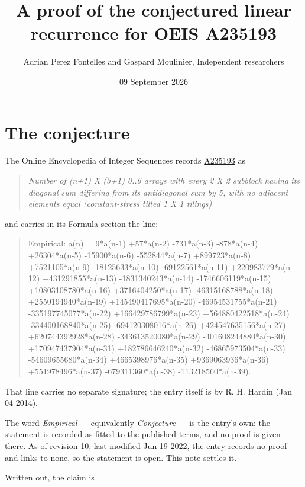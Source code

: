 \documentclass[11pt]{article}
\title{A proof of the conjectured linear recurrence for OEIS A235193}
\author{Adrian Perez Fontelles and Gaspard Moulinier, Independent researchers}
\date{09 September 2026}
\theoremstyle{definition}
\begin{document}
\maketitle
\section{The conjecture}

The Online Encyclopedia of Integer Sequences records \href{https://oeis.org/A235193}{A235193} as

\begin{quote}\itshape Number of (n+1) X (3+1) 0..6 arrays with every 2 X 2 subblock having its diagonal sum differing from its antidiagonal sum by 5, with no adjacent elements equal (constant-stress tilted 1 X 1 tilings)\end{quote}

and carries in its Formula section the line:

\begin{quote}\ttfamily Empirical: a(n) = 9*a(n-1) +57*a(n-2) -731*a(n-3) -878*a(n-4) +26304*a(n-5) -15900*a(n-6) -552844*a(n-7) +899723*a(n-8) +7521105*a(n-9) -18125633*a(n-10) -69122561*a(n-11) +220983779*a(n-12) +431291855*a(n-13) -1831340243*a(n-14) -1746606119*a(n-15) +10803108780*a(n-16) +3716404250*a(n-17) -46315168788*a(n-18) +2550194940*a(n-19) +145490417695*a(n-20) -46954531755*a(n-21) -335197745077*a(n-22) +166429786799*a(n-23) +564880422518*a(n-24) -334400168840*a(n-25) -694120308016*a(n-26) +424547635156*a(n-27) +620744392928*a(n-28) -343613520080*a(n-29) -401608244880*a(n-30) +170947437904*a(n-31) +182786646240*a(n-32) -46865973504*a(n-33) -54609655680*a(n-34) +4665398976*a(n-35) +9369063936*a(n-36) +551978496*a(n-37) -679311360*a(n-38) -113218560*a(n-39).\end{quote}

That line carries no separate signature; the entry itself is by R. H. Hardin (Jan 04 2014).

The word {\itshape Empirical} --- equivalently {\itshape Conjecture} --- is the entry's own: the statement is recorded as fitted to the published terms, and no proof is given there. As of revision 10, last modified Jun 19 2022, the entry records no proof and links to none, so the statement is open. This note settles it.

Written out, the claim is
\end{document}
